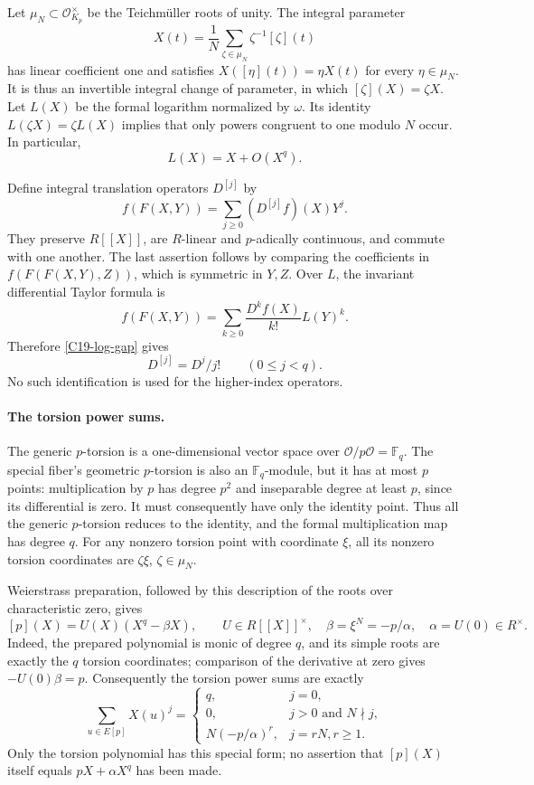 Let $\mu_N\subset\mathcal O_{K_p}^\times$ be the Teichm\"uller
roots of unity.  The integral parameter
\[
 X(t)=\frac1N\sum_{\zeta\in\mu_N}\zeta^{-1}[\zeta](t)
\]
has linear coefficient one and satisfies
$X([\eta](t))=\eta X(t)$ for every $\eta\in\mu_N$.
It is thus an invertible integral change of parameter, in which
$[\zeta](X)=\zeta X$.
Let $L(X)$ be the formal logarithm normalized by $\omega$.
Its identity $L(\zeta X)=\zeta L(X)$ implies that only powers
congruent to one modulo $N$ occur.  In particular,
\begin{equation}\label{C19-log-gap}
 L(X)=X+O(X^q).
\end{equation}

Define integral translation operators $D^{[j]}$ by
\[
 f(F(X,Y))=\sum_{j\geq0}(D^{[j]}f)(X)Y^j.
\]
They preserve $R[[X]]$, are $R$-linear and $p$-adically continuous,
and commute with one another.  The last assertion follows by
comparing the coefficients in
$f(F(F(X,Y),Z))$, which is symmetric in $Y,Z$.
Over $L$, the invariant differential Taylor formula is
\[
 f(F(X,Y))=\sum_{k\geq0}\frac{D^kf(X)}{k!}L(Y)^k.
\]
Therefore \eqref{C19-log-gap} gives
\begin{equation}\label{C19-small-Hasse}
 D^{[j]}=D^j/j!\qquad(0\leq j<q).
\end{equation}
No such identification is used for the higher-index operators.

\paragraph{The torsion power sums.}
The generic $p$-torsion is a one-dimensional vector space over
$\mathcal O/p\mathcal O=\mathbb F_q$.  The special fiber's
geometric $p$-torsion is also an $\mathbb F_q$-module, but it has
at most $p$ points: multiplication by $p$ has degree $p^2$ and
inseparable degree at least $p$, since its differential is zero.
It must consequently have only the identity point.
Thus all the generic $p$-torsion reduces to the identity, and
the formal multiplication map has degree $q$.
For any nonzero torsion point with coordinate $\xi$, all its
nonzero torsion coordinates are $\zeta\xi$, $\zeta\in\mu_N$.

Weierstrass preparation, followed by this description of the
roots over characteristic zero, gives
\[
 [p](X)=U(X)(X^q-\beta X),\qquad
 U\in R[[X]]^\times,\quad
 \beta=\xi^N=-p/\alpha,\quad \alpha=U(0)\in R^\times.
\]
Indeed, the prepared polynomial is monic of degree $q$, and its
simple roots are exactly the $q$ torsion coordinates; comparison
of the derivative at zero gives $-U(0)\beta=p$.
Consequently the torsion power sums are exactly
\begin{equation}\label{C19-power-sums}
 \sum_{u\in E[p]}X(u)^j=
 \begin{cases}
 q,&j=0,\\
 0,&j>0\text{ and }N\nmid j,\\
 N(-p/\alpha)^r,&j=rN, r\geq1.
 \end{cases}
\end{equation}
Only the torsion polynomial has this special form; no assertion
that $[p](X)$ itself equals $pX+\alpha X^q$ has been made.

